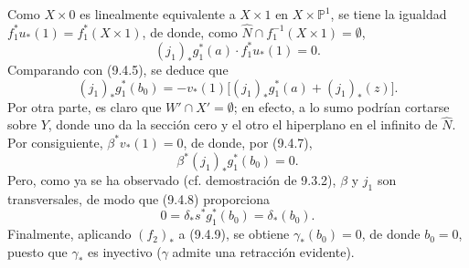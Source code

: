 Como $X\times0$ es linealmente equivalente a $X\times1$ en $X\times\mathbb P^1$, se tiene la igualdad $f_1^*u_*(1)=f_1^*(X\times1)$, de donde, como $\widehat N\cap f_1^{-1}(X\times1)=\emptyset$,
\[
(j_1)_*g_1^*(a)\cdot f_1^*u_*(1)=0.
\tag{9.4.6}
\]
Comparando con (9.4.5), se deduce que
\[
(j_1)_*g_1^*(b_0)=-v_*(1)\bigl[(j_1)_*g_1^*(a)+(j_1)_*(z)\bigr].
\tag{9.4.7}
\]
Por otra parte, es claro que $W'\cap X'=\emptyset$; en efecto, a lo sumo podrían cortarse sobre $Y$, donde uno da la sección cero y el otro el hiperplano en el infinito de $\widehat N$. Por consiguiente, $\beta^*v_*(1)=0$, de donde, por (9.4.7),
\[
\beta^*(j_1)_*g_1^*(b_0)=0.
\tag{9.4.8}
\]
Pero, como ya se ha observado (cf. demostración de 9.3.2), $\beta$ y $j_1$ son transversales, de modo que (9.4.8) proporciona
\[
0=\delta_*s^*g_1^*(b_0)=\delta_*(b_0).
\tag{9.4.9}
\]
Finalmente, aplicando $(f_2)_*$ a (9.4.9), se obtiene $\gamma_*(b_0)=0$, de donde $b_0=0$, puesto que $\gamma_*$ es inyectivo ($\gamma$ admite una retracción evidente).
